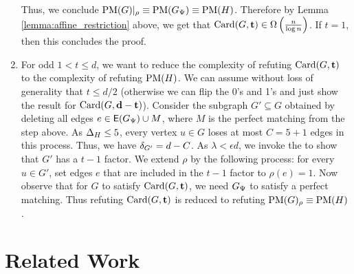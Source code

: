 \documentclass[11pt]{article}
\begin{document}
\begin{enumerate}
{Thus, we conclude $\text{PM}(G)|_\rho \equiv \text{PM}(G_{\Psi}) \equiv \text{PM}(H)$. Therefore by Lemma \ref{lemma:affine_restriction} above, we get that $\text{Card}(G, \mathbf{t}) \in \Omega\left(\frac{n}{\log n}\right)$. If $t=1$, then this concludes the proof.
}
  
\item{ For odd $1 < t \leq d$, we want to reduce the complexity of refuting $\text{Card}(G, \mathbf{t})$ to the complexity of refuting $\text{PM}(H)$.
We can assume without loss of generality that $t \le d/2$ (otherwise we can flip the 0's and 1's and just show the result for $\text{Card}(G, \mathbf{d-t})$).  
Consider the subgraph $G' \subseteq G$ obtained by deleting all edges $e \in \mathsf{E}(G_{\Psi}) \cup M$, where $M$ is the perfect matching from the step above.
As $\Delta_{H} \leq 5$, every vertex $u \in G$ loses at most $C=5 + 1$ edges in this process.
Thus, we have $\delta_{G'} = d - C$.
As $\lambda < \epsilon d$, we invoke the  to show that $G'$ has a $t-1$ factor.
We extend $\rho$ by the following process: for every $u \in G'$, set edges $e$ that are included in the $t-1$ factor to $\rho(e) = 1$.
Now observe that for $G$ to satisfy $\text{Card}(G, \mathbf{t})$, we need $G_{\Psi}$ to satisfy a perfect matching.
Thus refuting $\text{Card}(G, \mathbf{t})$ is reduced to refuting $\text{PM}(G)_{\rho} \equiv \text{PM}(H)$.
}

\end{enumerate}



\section{Related Work}
\label{sec:related-work}

\newpage


\clearpage
\appendix
\end{document}
